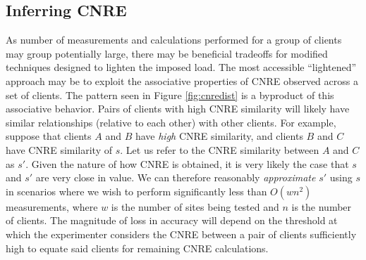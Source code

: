\subsection{Inferring CNRE}

As number of measurements and calculations performed for a group of clients may
group potentially large, there may be beneficial tradeoffs for modified
techniques designed to lighten the imposed load. The most accessible
``lightened'' approach may be to exploit the associative properties of CNRE
observed across a set of clients. The
pattern seen in Figure \ref{fig:cnredist} is a byproduct of this associative
behavior.  Pairs of clients with high CNRE similarity
will likely have similar relationships (relative to each other) with other
clients. For example, suppose that clients $A$ and $B$ have \emph{high} CNRE
similarity, and clients $B$ and $C$ have CNRE similarity of $s$. Let us refer to
the CNRE similarity between $A$ and $C$ as $s'$. Given the nature of how CNRE is
obtained, it is very likely the case that $s$ and $s'$ are very close in value.
We can therefore reasonably \emph{approximate} $s'$ using $s$ in scenarios where
we wish to perform significantly less than $O(wn^2)$ measurements, where $w$ is the
number of sites being tested and $n$ is the number of clients. The magnitude of
loss in accuracy will depend on the threshold at which the experimenter
considers the CNRE between a pair of clients sufficiently high to equate said
clients for remaining CNRE calculations. 
